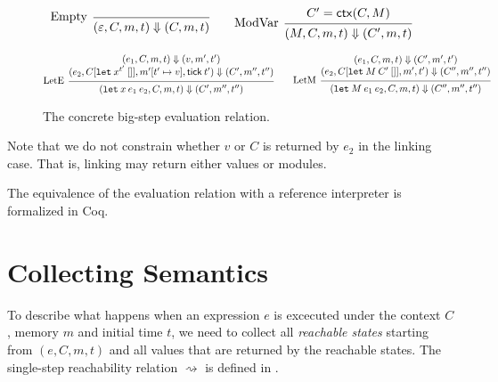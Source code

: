 \documentclass[acmsmall,screen]{acmart}
\theoremstyle{definition}
\newcommand*{\mem}{m}
\newcommand*{\tick}{\mathsf{tick}}
\newcommand*{\modctx}{\mathsf{ctx}}
\begin{document}
\begin{figure}[htb]
  \[
    \begin{prooftree}
      \infer[left label=Empty]0{
      (\varepsilon, C, \mem, t)
      \Downarrow
      (C, \mem, t)
      }
    \end{prooftree}\qquad
    \begin{prooftree}
      \hypo{C'=\modctx(C,M)}
      \infer[left label=ModVar]1{
      (M, C, \mem, t)
      \Downarrow
      (C', \mem, t)
      }
    \end{prooftree}
  \]

  \[
    \begin{prooftree}
      \hypo{
        \begin{matrix}
          (e_{1}, C, \mem, t)
          \Downarrow
          (v, \mem', t') \\
          (e_{2}, C[\mathtt{let}\:x^{t'}\:[]], \mem'[t'\mapsto v], \tick\:t')
          \Downarrow
          (C', \mem'', t'')
        \end{matrix}
      }
      \infer[left label=LetE]1{
      (\mathtt{let}\:x\:e_1\:e_2, C, \mem, t)
      \Downarrow
      (C', \mem'', t'')
      }
    \end{prooftree}\qquad
    \begin{prooftree}
      \hypo{
        \begin{matrix}
          (e_{1}, C, \mem, t)
          \Downarrow
          (C', \mem', t') \\
          (e_{2}, C[\mathtt{let}\:M\:C'\:[]], \mem', t')
          \Downarrow
          (C'', \mem'', t'')
        \end{matrix}
      }
      \infer[left label=LetM]1{
      (\mathtt{let}\:M\:e_{1}\:e_{2}, C, \mem, t)
      \Downarrow
      (C'', \mem'', t'')
      }
    \end{prooftree}
  \]
  \caption{The concrete big-step evaluation relation.}
\end{figure}
Note that we do not constrain whether $v$ or $C$ is returned by $e_{2}$ in the linking case.
That is, linking may return either values or modules.

The equivalence of the evaluation relation with a reference interpreter is formalized in Coq.

\section{Collecting Semantics}

To describe what happens when an expression $e$ is excecuted under the context $C$, memory $\mem$ and initial time $t$, we need to collect all \emph{reachable states} starting from $(e,C,\mem,t)$ and all values that are returned by the reachable states.
The single-step reachability relation $\rightsquigarrow$ is defined in .
\end{document}
